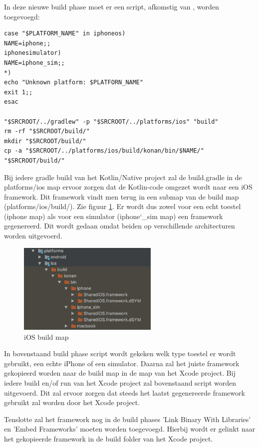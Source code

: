 In deze nieuwe build phase moet er een script, afkomstig van \textcite{AlbertGao}, worden toegevoegd: 
\begin{lstlisting}
case "$PLATFORM_NAME" in iphoneos)
NAME=iphone;;
iphonesimulator)
NAME=iphone_sim;;
*)
echo "Unknown platform: $PLATFORN_NAME"
exit 1;;
esac

"$SRCROOT/../gradlew" -p "$SRCROOT/../platforms/ios" "build"
rm -rf "$SRCROOT/build/"
mkdir "$SRCROOT/build/"
cp -a "$SRCROOT/../platforms/ios/build/konan/bin/$NAME/" "$SRCROOT/build/"
\end{lstlisting}

Bij iedere gradle build van het Kotlin/Native project zal de build.gradle in de platforms/ios map ervoor zorgen dat de Kotlin-code omgezet wordt naar een iOS framework. Dit framework vindt men terug in een submap van de build map (platforms/ios/build/). Zie figuur \ref{fig:stap6-build}. Er wordt dus zowel voor een echt toestel (iphone map) als voor een simulator (iphone\char`_sim map) een framework gegenereerd. Dit wordt gedaan omdat beiden op verschillende architecturen worden uitgevoerd.

\begin{figure} [ht]
	\centering
	\includegraphics[width=0.60\textwidth]{img/stap6-build.png}
	\caption{iOS build map}
	\label{fig:stap6-build}
\end{figure}

In bovenstaand build phase script wordt gekeken welk type toestel er wordt gebruikt, een echte iPhone of een simulator. Daarna zal het juiste framework gekopieerd worden naar de build map in de map van het Xcode project. Bij iedere build en/of run van het Xcode project zal bovenstaand script worden uitgevoerd. Dit zal ervoor zorgen dat steeds het laatst gegenereerde framework gebruikt zal worden door het Xcode project.

Tenslotte zal het framework nog in de build phases 'Link Binary With Libraries' en 'Embed Frameworks' moeten worden toegevoegd. Hierbij wordt er gelinkt naar het gekopieerde framework in de build folder van het Xcode project.

